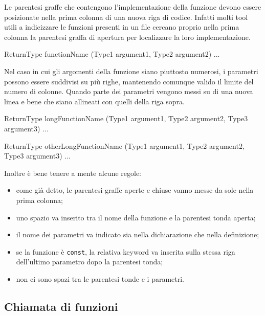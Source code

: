 Le parentesi graffe che contengono l'implementazione della funzione devono essere posizionate nella prima colonna di una nuova riga di codice.
Infatti molti tool utili a indicizzare le funzioni presenti in un file cercano proprio nella prima colonna la parentesi graffa di apertura per localizzare la loro implementazione.

\begin{minipage}[t]{\rbwidth}
\begin{RightCode}
ReturnType
functionName (Type1 argument1, Type2 argument2)
{
  ...
}
\end{RightCode}
\end{minipage}%

Nel caso in cui gli argomenti della funzione siano piuttosto numerosi, i parametri possono essere suddivisi su più righe, mantenendo comunque valido il limite del numero di colonne.
Quando parte dei parametri vengono messi su di una nuova linea e bene che siano allineati con quelli della riga sopra.

\begin{minipage}[t]{\rbwidth}
\begin{RightCode}
ReturnType
longFunctionName (Type1 argument1, Type2 argument2,
                  Type3 argument3)
{
  ...
}

ReturnType
otherLongFunctionName (Type1 argument1,
                       Type2 argument2,
                       Type3 argument3)
{
  ...
}
\end{RightCode}
\end{minipage}%

Inoltre è bene tenere a mente alcune regole:
\begin{itemize}
	\item come già detto, le parentesi graffe aperte e chiuse vanno messe da sole nella prima colonna;
	\item uno spazio va inserito tra il nome della funzione e la parentesi tonda aperta;
	\item il nome dei parametri va indicato sia nella dichiarazione che nella definizione;
	\item se la funzione è \texttt{const}, la relativa keyword va inserita sulla stessa riga dell'ultimo parametro dopo la parentesi tonda;
	\item non ci sono spazi tra le parentesi tonde e i parametri.
\end{itemize}

\subsection{Chiamata di funzioni}

